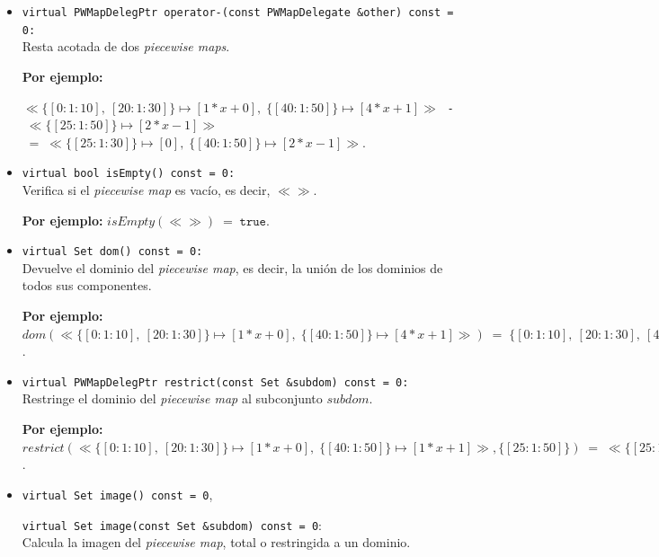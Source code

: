 \begin{itemize}
    \item \texttt{virtual PWMapDelegPtr operator-(const PWMapDelegate \&other) const = 0:} \\
    Resta acotada de dos \textit{piecewise maps}.

        \begin{center}
        \textbf{Por ejemplo:} 
        
            $\ll\{[0:1:10],\ [20:1:30]\} \mapsto [1*x+0],\; \{[40:1:50]\} \mapsto [4*x+1]\gg\;$
            \texttt{-}
            $\;\ll\{[25:1:50]\} \mapsto [2*x-1]\gg$
            $\; =\; \ll\{[25:1:30]\} \mapsto [0],\; \{[40:1:50]\} \mapsto [2*x-1]\gg.$
    \end{center}

    \item \texttt{virtual bool isEmpty() const = 0:} \\
    Verifica si el \textit{piecewise map} es vacío, es decir, $\ll\gg$.

    \begin{center}
        \textbf{Por ejemplo:} $isEmpty(\ll\gg)\;=\;\texttt{true}$.
    \end{center}

    \item \texttt{virtual Set dom() const = 0:} \\
    Devuelve el dominio del \textit{piecewise map}, es decir, la unión de los dominios de todos sus componentes.

        \begin{center}
        \textbf{Por ejemplo:} $dom(\ll\{[0:1:10],\ [20:1:30]\} \mapsto [1*x+0],\; \{[40:1:50]\} \mapsto [4*x+1]\gg)\;=\;\{[0:1:10],\ [20:1:30],\ [40:1:50]\}$.
    \end{center}

    \item \texttt{virtual PWMapDelegPtr restrict(const Set \&subdom) const = 0:} \\
    Restringe el dominio del \textit{piecewise map} al subconjunto $subdom$.

    \begin{center}
        \textbf{Por ejemplo:} $restrict(\ll\{[0:1:10],\ [20:1:30]\} \mapsto [1*x+0],\; \{[40:1:50]\} \mapsto [1*x+1]\gg,  \{[25:1:50]\} )\;=\;\ll\{[25:1:30]\} \mapsto [1*x+0],\; \{[40:1:50]\} \mapsto [1*x+1]\gg$.
    \end{center}
    

    \item \texttt{virtual Set image() const = 0}, \par  \texttt{virtual Set image(const Set \&subdom) const = 0}: \\
    Calcula la imagen del \textit{piecewise map}, total o restringida a un dominio.


\end{itemize}
